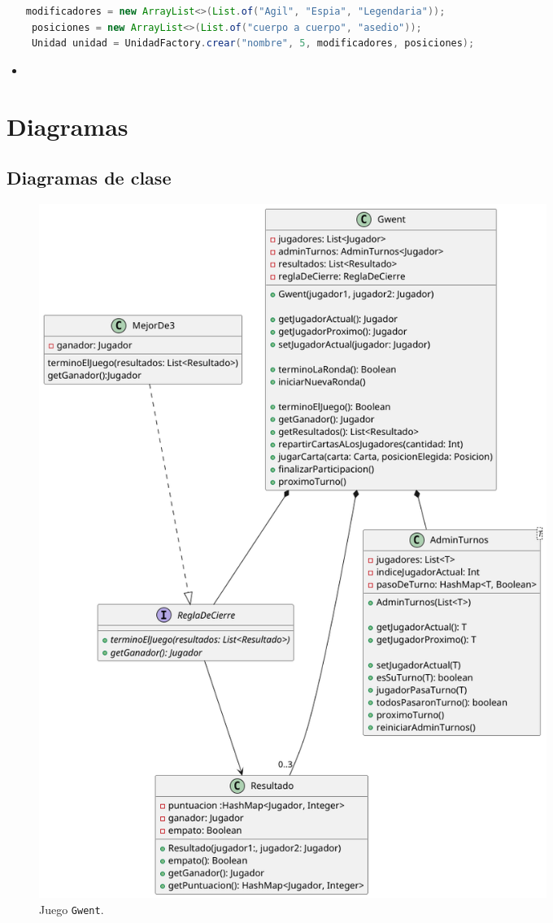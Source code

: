 \documentclass[titlepage,a4paper]{article}
\begin{document}
\begin{itemize}
		\begin{lstlisting}[language=Java, caption={Ejemplo de creación de unidad usando UnidadFactory}]
 modificadores = new ArrayList<>(List.of("Agil", "Espia", "Legendaria"));
 posiciones = new ArrayList<>(List.of("cuerpo a cuerpo", "asedio"));
 Unidad unidad = UnidadFactory.crear("nombre", 5, modificadores, posiciones);
		\end{lstlisting}

	\item \end{itemize}


	\section{Diagramas}\label{sec:diagramas}


	\subsection{Diagramas de clase}\label{sec:diagramasdeclase}

	\begin{figure}[H]
		\centering
		\includegraphics[width=0.8\textwidth]{diagramas/clases/Gwent}
		\caption{\label{fig:class01}Juego \texttt{Gwent}.}
	\end{figure}
\end{document}
